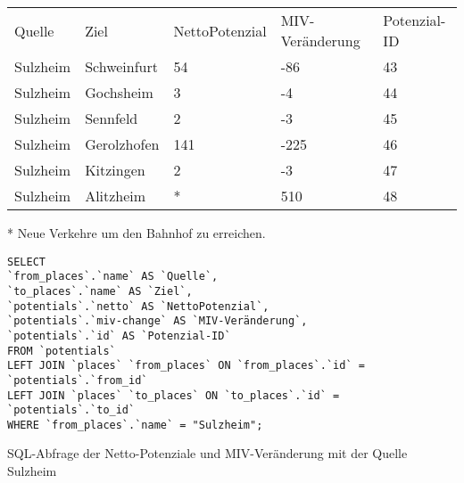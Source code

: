 \begin{tabularx}{\textwidth}{*5{X}}
Quelle & Ziel & NettoPotenzial & MIV-Veränderung & Potenzial-ID\\ 
Sulzheim & Schweinfurt & 54 & -86 & 43\\ 
Sulzheim & Gochsheim & 3 & -4 & 44\\ 
Sulzheim & Sennfeld & 2 & -3 & 45\\ 
Sulzheim & Gerolzhofen & 141 & -225 & 46\\ 
Sulzheim & Kitzingen & 2 & -3 & 47\\ 
Sulzheim & Alitzheim & * & 510 & 48\\ 
\end{tabularx}    
\newline
\newline
* Neue Verkehre um den Bahnhof zu erreichen.
\newline
\begin{listing}[htbp]
\begin{verbatim}
SELECT
`from_places`.`name` AS `Quelle`, 
`to_places`.`name` AS `Ziel`, 
`potentials`.`netto` AS `NettoPotenzial`, 
`potentials`.`miv-change` AS `MIV-Veränderung`, 
`potentials`.`id` AS `Potenzial-ID`
FROM `potentials`
LEFT JOIN `places` `from_places` ON `from_places`.`id` = `potentials`.`from_id`
LEFT JOIN `places` `to_places` ON `to_places`.`id` = `potentials`.`to_id`
WHERE `from_places`.`name` = "Sulzheim";
\end{verbatim}
\caption{SQL-Abfrage der Netto-Potenziale und MIV-Veränderung mit der Quelle Sulzheim}\label{lst-fz-sulzheim}
\end{listing}